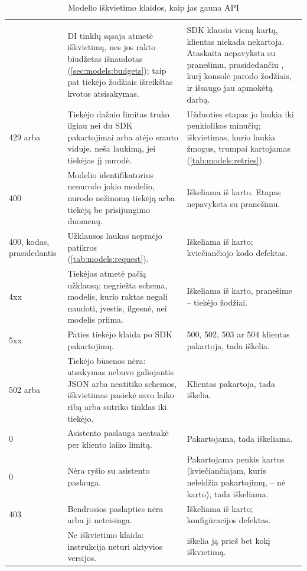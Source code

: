 \begin{xltabular}{\textwidth}{@{}L{41mm}L{50mm}Y@{}}
\caption{Modelio iškvietimo klaidos, kaip jas gauna API}\label{tab:models:errors}\\
\toprule
{} &  &  \\
\midrule
\endfirsthead
\toprule
{} &  &  \\
\midrule
\endhead
\bottomrule
{}  & DI tinklų sąsaja atmetė iškvietimą, nes jos rakto biudžetas išnaudotas (\cref{sec:models:budgets}); taip pat tiekėjo žodžiais išreikštas kvotos atsisakymas. & SDK klausia vieną kartą, klientas niekada nekartoja. Ataskaita nepavyksta su pranešimu, prasidedančiu , kurį konsolė parodo žodžiais, ir išsaugo jau apmokėtą darbą. \\
429  arba  & Tiekėjo dažnio limitas truko ilgiau nei du SDK pakartojimai arba atėjo srauto viduje.  neša laukimą, jei tiekėjas jį nurodė. & Užduoties etapas jo laukia iki penkiolikos minučių; iškvietimas, kurio laukia žmogus, trumpai kartojamas (\cref{tab:models:retries}). \\
400  & Modelio identifikatorius nenurodo jokio modelio, nurodo nežinomą tiekėją arba tiekėją be prisijungimo duomenų. & Iškeliama iš karto. Etapas nepavyksta su pranešimu. \\
400, kodas, prasidedantis  & Užklausos laukas nepraėjo patikros (\cref{tab:models:request}). & Iškeliama iš karto; kviečiančiojo kodo defektas. \\
4xx  & Tiekėjas atmetė pačią užklausą: negriežta schema, modelis, kurio raktas negali naudoti, įvestis, ilgesnė, nei modelis priima. & Iškeliama iš karto, pranešime -- tiekėjo žodžiai. \\
5xx  & Paties tiekėjo klaida po SDK pakartojimų. & 500, 502, 503 ar 504 klientas pakartoja, tada iškelia. \\
502  arba  & Tiekėjo būsenos nėra: atsakymas nebuvo galiojantis JSON arba neatitiko schemos, iškvietimas pasiekė savo laiko ribą arba sutriko tinklas iki tiekėjo. & Klientas pakartoja, tada iškelia. \\
0  & Asistento paslauga neatsakė per kliento laiko limitą. & Pakartojama, tada iškeliama. \\
0  & Nėra ryšio su asistento paslauga. & Pakartojama penkis kartus (kviečiančiajam, kuris neleidžia pakartojimų, -- nė karto), tada iškeliama. \\
403  & Bendrosios paslapties nėra arba ji neteisinga. & Iškeliama iš karto; konfigūracijos defektas. \\
 & Ne iškvietimo klaida: instrukcija neturi aktyvios versijos. &  iškelia ją prieš bet kokį iškvietimą. \\
\end{xltabular}

